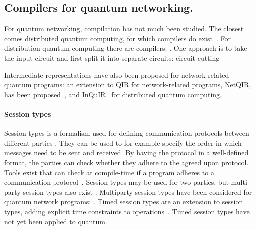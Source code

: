 




\subsection{Compilers for quantum networking.}
For quantum networking, compilation has not much been studied.
The closest comes distributed quantum computing, for which compilers do exist~\cite{ferrari_compiler_2021, chatterjee_qurzon_2022, cuomo_optimized_2023, ferrari_modular_2023}.
For distribution quantum computing there are compilers: \cite{ferrari_compiler_2021, haner_distributed_2021, cuomo_optimized_2023, ferrari_modular_2023}.
One approach is to take the input circuit and first split it into separate circuits: circuit cutting~\cite{chatterjee_qurzon_2022}

Intermediate representations have also been proposed for network-related quantum programs:
an extension to QIR for network-related programs, NetQIR, has been proposed~\cite{vazquez-perez_netqir_2024}, and InQuIR~\cite{nishio_inquir_2023} for distributed quantum computing.


\paragraph{Session types}

Session types is a formalism used for defining communication protocols between different parties \cite{honda_language_1998}.
They can be used to for example specify the order in which messages need to be sent and received.
By having the protocol in a well-defined format, the parties can check whether they adhere to the agreed upon protocol.
Tools exist that can check at compile-time if a program adheres to a communication protocol~\cite{davidson_model_nodate, ardeshir-larijani_automated_2018}.
Session types may be used for two parties, but multi-party session types also exist \cite{honda_multiparty_2016}.
Multiparty session types have been considered for quantum network programs: \cite{lanese_towards_2024}.
Timed session types are an extension to session types, adding explicit time constraints to operations~\cite{bartoletti_timed_2017}.
Timed session types have not yet been applied to quantum.



